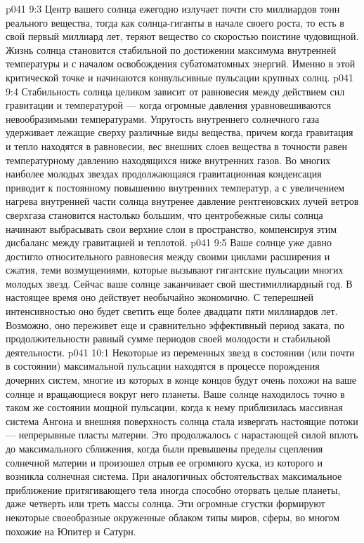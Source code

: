 \vs p041 9:3 \pc Центр вашего солнца ежегодно излучает почти сто миллиардов тонн реального вещества, тогда как солнца\hyp{}гиганты в начале своего роста, то есть в свой первый миллиард лет, теряют вещество со скоростью поистине чудовищной. Жизнь солнца становится стабильной по достижении максимума внутренней температуры и с началом освобождения субатоматомных энергий. Именно в этой критической точке и начинаются конвульсивные пульсации крупных солнц.
\vs p041 9:4 Стабильность солнца целиком зависит от равновесия между действием сил гравитации и температурой --- когда огромные давления уравновешиваются невообразимыми температурами. Упругость внутреннего солнечного газа удерживает лежащие сверху различные виды вещества, причем когда гравитация и тепло находятся в равновесии, вес внешних слоев вещества в точности равен температурному давлению находящихся ниже внутренних газов. Во многих наиболее молодых звездах продолжающаяся гравитационная конденсация приводит к постоянному повышению внутренних температур, а с увеличением нагрева внутренней части солнца внутренее давление рентгеновских лучей ветров сверхгаза становится настолько большим, что центробежные силы солнца начинают выбрасывать свои верхние слои в пространство, компенсируя этим дисбаланс между гравитацией и теплотой.
\vs p041 9:5 Ваше солнце уже давно достигло относительного равновесия между своими циклами расширения и сжатия, теми возмущениями, которые вызывают гигантские пульсации многих молодых звезд. Сейчас ваше солнце заканчивает свой шестимиллиардный год. В настоящее время оно действует необычайно экономично. С теперешней интенсивностью оно будет светить еще более двадцати пяти миллиардов лет. Возможно, оно переживет еще и сравнительно эффективный период заката, по продолжительности равный сумме периодов своей молодости и стабильной деятельности.
\vs p041 10:1 Некоторые из переменных звезд в состоянии (или почти в состоянии) максимальной пульсации находятся в процессе порождения дочерних систем, многие из которых в конце концов будут очень похожи на ваше солнце и вращающиеся вокруг него планеты. Ваше солнце находилось точно в таком же состоянии мощной пульсации, когда к нему приблизилась массивная система Ангона и внешняя поверхность солнца стала извергать настоящие потоки --- непрерывные пласты материи. Это продолжалось с нарастающей силой вплоть до максимального сближения, когда были превышены пределы сцепления солнечной материи и произошел отрыв ее огромного куска, из которого и возникла солнечная система. При аналогичных обстоятельствах максимальное приближение притягивающего тела иногда способно оторвать целые планеты, даже четверть или треть массы солнца. Эти огромные сгустки формируют некоторые своеобразные окруженные облаком типы миров, сферы, во многом похожие на Юпитер и Сатурн.
